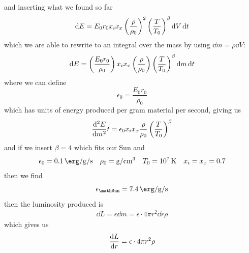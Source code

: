 and inserting what we found so far
\begin{equation}
	\mathop{}\!\mathrm{d} E = E_0r_0x_i x_x\left(\frac{\rho}{\rho_0}\right)^2\left(\frac{T}{T_0}\right)^\beta \mathop{}\!\mathrm{d} V \mathop{}\!\mathrm{d} t
\end{equation}
which we are able to rewrite to an integral over the mass by using \(\dd m = \rho\dd V\):
\begin{equation}
	\mathop{}\!\mathrm{d} E = \left(\frac{E_0r_0}{\rho_0}\right)x_i x_x\left(\frac{\rho}{\rho_0}\right)\left(\frac{T}{T_0}\right)^\beta \mathop{}\!\mathrm{d} m \mathop{}\!\mathrm{d} t
\end{equation}
where we can define
\begin{equation}
	\epsilon_0 = \frac{E_0r_0}{\rho_0}
\end{equation}
which has units of energy produced per gram material per second, giving us
\begin{equation}
	\diff[2]{E}{m}{t} = \epsilon_0x_i x_x\frac{\rho}{\rho_0}\ins{\frac{T}{T_0}}^\beta
\end{equation}
and if we insert \(\beta=4\) which fits our Sun and
\begin{align}
	\epsilon_0 = \SI{0.1}{\erg\per\gram\per\second} && \rho_0 = \SI{}{\gram\per\centi\meter^3} && T_0 = \SI{e7}{\kelvin} && x_i=x_x=0.7
\end{align}
then we find
\begin{equation}
	\epsilon_\mathSun = \SI{7.4}{\erg\per\gram\per\second}
\end{equation}
then the luminosity produced is
\begin{align}
	\dd L = \epsilon\dd m = \epsilon\cdot 4\pi r^2\dd r\rho
\end{align}
which gives us
\begin{equation}
	\diff{L}{r} = \epsilon\cdot4\pi r^2 \rho
\end{equation}
